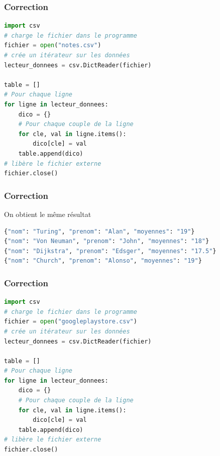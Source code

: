 \documentclass[svgnames,11pt]{beamer}
\begin{document}
\begin{frame}[fragile]
    \frametitle{Correction}

    \begin{center}
        \begin{lstlisting}[language=Python, basicstyle=\small]
import csv
# charge le fichier dans le programme
fichier = open("notes.csv")
# crée un itérateur sur les données
lecteur_donnees = csv.DictReader(fichier)

table = []
# Pour chaque ligne
for ligne in lecteur_donnees:
    dico = {}
    # Pour chaque couple de la ligne
    for cle, val in ligne.items():
        dico[cle] = val
    table.append(dico)
# libère le fichier externe
fichier.close()
\end{lstlisting}
        \label{CODE}
    \end{center}
\end{frame}
\begin{frame}[fragile]
    \frametitle{Correction}
On obtient le même résultat
\begin{center}
    \begin{lstlisting}[language=Python, xleftmargin=0.3em,xrightmargin=0.5em,basicstyle=\small]
{"nom": "Turing", "prenom": "Alan", "moyennes": "19"}
{"nom": "Von Neuman", "prenom": "John", "moyennes": "18"}
{"nom": "Dijkstra", "prenom": "Edsger", "moyennes": "17.5"}
{"nom": "Church", "prenom": "Alonso", "moyennes": "19"}

\end{lstlisting}
\end{center}

\end{frame}
\begin{frame}[fragile]
    \frametitle{Correction}

    \begin{center}
        \begin{lstlisting}[language=Python, basicstyle=\small]
import csv
# charge le fichier dans le programme
fichier = open("googleplaystore.csv")
# crée un itérateur sur les données
lecteur_donnees = csv.DictReader(fichier)

table = []
# Pour chaque ligne
for ligne in lecteur_donnees:
    dico = {}
    # Pour chaque couple de la ligne
    for cle, val in ligne.items():
        dico[cle] = val
    table.append(dico)
# libère le fichier externe
fichier.close()
\end{lstlisting}
        \label{CODE}
    \end{center}
\end{frame}
\end{document}
